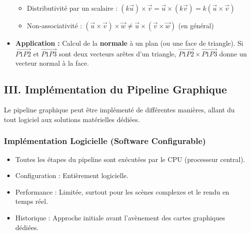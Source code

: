 \documentclass{article}
\begin{document}
\begin{itemize}
\begin{itemize}
        \item Distributivité par un scalaire : $(k\vec{u}) \times \vec{v} = \vec{u} \times (k\vec{v}) = k (\vec{u} \times \vec{v})$
        \item Non-associativité : $(\vec{u} \times \vec{v}) \times \vec{w} \ne \vec{u} \times (\vec{v} \times \vec{w})$ (en général)
    \end{itemize}
    \item \textbf{Application :} Calcul de la \textbf{normale} à un plan (ou une face de triangle). Si $\vec{P1P2}$ et $\vec{P1P3}$ sont deux vecteurs arêtes d'un triangle, $\vec{P1P2} \times \vec{P1P3}$ donne un vecteur normal à la face.
\end{itemize}

\subsection{III. Implémentation du Pipeline Graphique}

Le pipeline graphique peut être implémenté de différentes manières, allant du tout logiciel aux solutions matérielles dédiées.

\subsubsection{Implémentation Logicielle (Software Configurable)}
\begin{itemize}
    \item Toutes les étapes du pipeline sont exécutées par le CPU (processeur central).
    \item Configuration : Entièrement logicielle.
    \item Performance : Limitée, surtout pour les scènes complexes et le rendu en temps réel.
    \item Historique : Approche initiale avant l'avènement des cartes graphiques dédiées.
\end{itemize}
\end{document}
